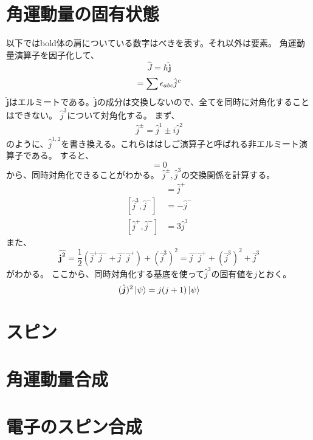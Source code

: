 \documentclass{jsarticle}
\newcommand{\half}{\frac{1}{2}}
\newcommand{\beq}{\begin{equation}}
\newcommand{\eeq}{\end{equation}}
\newcommand{\hj}{\hat{j}}
\newcommand{\hjm}{\hat{j}^{-}}
\newcommand{\hjp}{\hat{j}^{+}}
\newcommand{\hbj}{\hat{\bm{j}}}
\newcommand{\hbjt}{\hat{\bm{j^2}}}
\newcommand{\hcj}{\hat{J}}
\begin{document}
\section{角運動量の固有状態}
以下ではbold体の肩についている数字はべきを表す。それ以外は要素。
角運動量演算子を因子化して、
\beq
    \hcj = \hbar \hbj
\eeq
\beq
[\hj^a,\hj^b] = \sum \epsilon_{abc}\hj^c\\
\eeq
$\hbj$はエルミートである。$\hbj$の成分は交換しないので、全てを同時に対角化することはできない。
$\hj^3$について対角化する。
まず、
\begin{align}
    \hj^{\pm} = \hj^1 \pm i \hj^2
\end{align}
のように、$\hj^{1,2}$を書き換える。これらははしご演算子と呼ばれる非エルミート演算子である。
すると、
\beq
[\hbjt,\hj^3] = 0
\eeq
から、同時対角化できることがわかる。
$\hj^{\pm},\hj^3$の交換関係を計算する。
\begin{align}
    [\hj^3, \hj^{+}] &= \hj^{+}\\
[\hj^3, \hj^{-}] &= -\hj^{-}\\
[\hj^{+}, \hj^{-}] &= 3\hj^{3}
\end{align}
また、
\beq
\hbjt = \half (\hjp\hjm + \hjm\hjp) + (\hj^3)^2 =  \hjm\hjp + (\hj^3)^2 + \hj^3
\eeq
がわかる。
ここから、同時対角化する基底を使って$\hj^3$の固有値を$j$とおく。
\beq
    (\hbj)^2 \ket{\psi} = j(j+1)\ket{\psi}
\eeq
\section{スピン}
\section{角運動量合成}
\section{電子のスピン合成}
\end{document}
